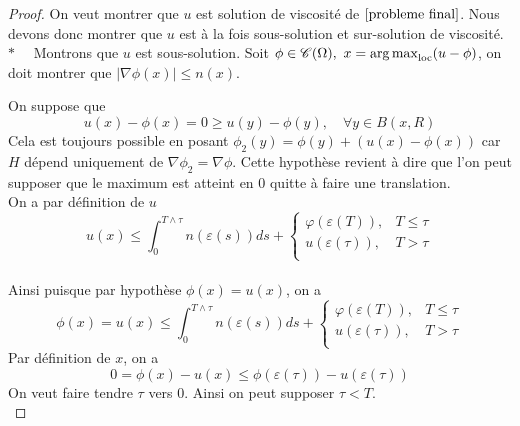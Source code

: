 \begin{proof}

On veut montrer que $u$ est solution de viscosité de $\eqref{probleme final}$. Nous devons donc montrer que $u$ est à la fois sous-solution et sur-solution de viscosité.\\

$\ast \quad$ Montrons que $u$ est sous-solution. Soit $ \phi \in \mathscr{C}(\Omega),\ x=\operatorname*{arg\,max}_{\text{loc}}(u-\phi)$, on doit montrer que $|\nabla\phi (x)|\le n(x)$.

On suppose que 
\begin{equation*}
    u(x)-\phi(x)=0\ge u(y)-\phi(y),\quad\forall y\in B(x,R)
\end{equation*}
Cela est toujours possible en posant $\phi_2(y)=\phi(y)+(u(x)-\phi(x))$ car $H$ dépend uniquement de $\nabla \phi_2=\nabla\phi$. Cette hypothèse revient à dire que l'on peut supposer que le maximum est atteint en $0$ quitte à faire une translation.\\

On a par définition de $u$ 
\begin{equation*}
    u(x)\le \int^{T\wedge \tau}_0 n(\varepsilon(s))ds +
    \begin{cases}
        \varphi\left(\varepsilon\left(T\right)\right), &T\le \tau\\
        u\left(\varepsilon\left(\tau\right)\right), &T> \tau\\ 
    \end{cases}
\end{equation*}\\
Ainsi puisque par hypothèse $\phi(x)=u(x)$, on a
\begin{equation*}
    \phi(x)=u(x)\le \int^{T\wedge \tau}_0 n(\varepsilon(s))ds 
    +\begin{cases}
        \varphi(\varepsilon(T)), &T\le \tau\\
        u(\varepsilon(\tau)), &T> \tau\\
    \end{cases}
\end{equation*}
Par définition de $x$, on a 
\begin{equation*}
    0=\phi(x)-u(x) \leq \phi(\varepsilon(\tau))-u(\varepsilon(\tau))
\end{equation*}
On veut faire tendre $\tau$ vers $0$. Ainsi on peut supposer $\tau<T$. \\


\end{proof}
